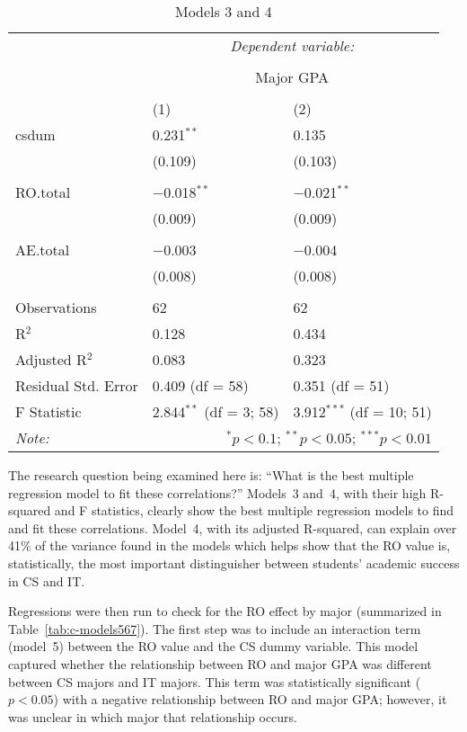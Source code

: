 \begin{table}[!htbp] \centering
  \caption[Models 3 and 4]{Models 3 and 4}
  \label{tab:c-models34}
  \begin{tabular}{@{\extracolsep{5pt}}lll}
    \toprule
     & \multicolumn{2}{c}{\textit{Dependent variable:}} \\
    \cline{2-3}
    \\[-1.8ex] & \multicolumn{2}{c}{Major GPA} \\
    \\[-1.8ex] & (1) & (2)\\
    \midrule
    csdum & 0.231$^{**}$ & 0.135 \\
      & (0.109) & (0.103) \\
      & & \\
    RO.total & $-$0.018$^{**}$ & $-$0.021$^{**}$ \\
      & (0.009) & (0.009) \\
      & & \\
    AE.total & $-$0.003 & $-$0.004 \\
      & (0.008) & (0.008) \\
      & & \\
    \midrule
    Observations & 62 & 62 \\
    R$^{2}$ & 0.128 & 0.434 \\
    Adjusted R$^{2}$ & 0.083 & 0.323 \\
    Residual Std. Error & 0.409 (df = 58) & 0.351 (df = 51) \\
    F Statistic & 2.844$^{**}$ (df = 3; 58) & 3.912$^{***}$ (df = 10; 51) \\
    \bottomrule
    \textit{Note:}  & \multicolumn{2}{r}{$^{*}p<0.1$; $^{**}p<0.05$; $^{***}p<0.01$} \\
  \end{tabular}
\end{table}

The research question being examined here is: ``What is the best multiple regression model to fit these correlations?'' Models~3 and~4, with their high R-squared and F statistics, clearly show the best multiple regression models to find and fit these correlations. Model~4, with its adjusted R-squared, can explain over 41\% of the variance found in the models which helps show that the RO value is, statistically, the most important distinguisher between students' academic success in CS and IT.

Regressions were then run to check for the RO effect by major (summarized in Table~\ref{tab:c-models567}). The first step was to include an interaction term (model~5) between the RO value and the CS dummy variable. This model captured whether the relationship between RO and major GPA was different between CS majors and IT majors. This term was statistically significant ($p<0.05$) with a negative relationship between RO and major GPA; however, it was unclear in which major that relationship occurs.

